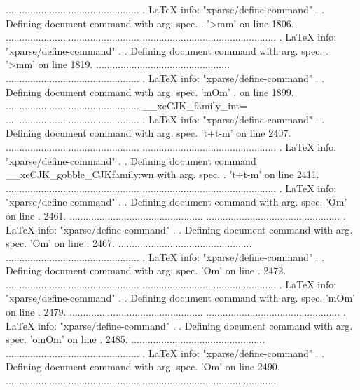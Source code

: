 .................................................
. LaTeX info: "xparse/define-command"
. 
. Defining document command \xeCJKDeclarePunctStyle with arg. spec.
. '>{\TrimSpaces }mm' on line 1806.
.................................................
.................................................
. LaTeX info: "xparse/define-command"
. 
. Defining document command \xeCJKEditPunctStyle with arg. spec.
. '>{\TrimSpaces }mm' on line 1819.
.................................................
.................................................
. LaTeX info: "xparse/define-command"
. 
. Defining document command \setCJKfallbackfamilyfont with arg. spec. 'mO{}m'
. on line 1899.
.................................................
\g__xeCJK_family_int=
.................................................
. LaTeX info: "xparse/define-command"
. 
. Defining document command \CJKfamily with arg. spec. 't+t-m' on line 2407.
.................................................
.................................................
. LaTeX info: "xparse/define-command"
. 
. Defining document command \__xeCJK_gobble_CJKfamily:wn with arg. spec.
. 't+t-m' on line 2411.
.................................................
.................................................
. LaTeX info: "xparse/define-command"
. 
. Defining document command \setCJKmainfont with arg. spec. 'O{}m' on line
. 2461.
.................................................
.................................................
. LaTeX info: "xparse/define-command"
. 
. Defining document command \setCJKsansfont with arg. spec. 'O{}m' on line
. 2467.
.................................................
.................................................
. LaTeX info: "xparse/define-command"
. 
. Defining document command \setCJKmonofont with arg. spec. 'O{}m' on line
. 2472.
.................................................
.................................................
. LaTeX info: "xparse/define-command"
. 
. Defining document command \setCJKfamilyfont with arg. spec. 'mO{}m' on line
. 2479.
.................................................
.................................................
. LaTeX info: "xparse/define-command"
. 
. Defining document command \newCJKfontfamily with arg. spec. 'omO{}m' on line
. 2485.
.................................................
.................................................
. LaTeX info: "xparse/define-command"
. 
. Defining document command \CJKfontspec with arg. spec. 'O{}m' on line 2490.
.................................................
.................................................

